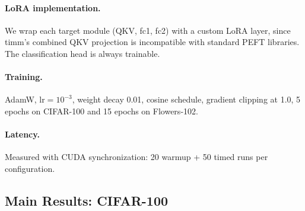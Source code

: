 \documentclass[10pt,twocolumn,letterpaper]{article}
\begin{document}
\paragraph{LoRA implementation.} We wrap each target module (QKV, fc1, fc2) with a custom LoRA layer, since timm's combined QKV projection is incompatible with standard PEFT libraries. The classification head is always trainable.

\paragraph{Training.} AdamW, $\text{lr}=10^{-3}$, weight decay 0.01, cosine schedule, gradient clipping at 1.0, 5 epochs on CIFAR-100 and 15 epochs on Flowers-102.

\paragraph{Latency.} Measured with CUDA synchronization: 20 warmup + 50 timed runs per configuration.

\subsection{Main Results: CIFAR-100}
\end{document}

